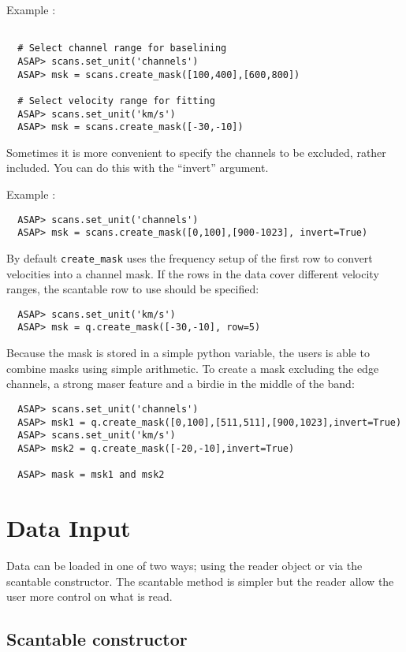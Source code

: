 \documentclass[11pt]{article}
\newcommand{\cmd}[1]{{\tt #1}}
\begin{document}
Example :
\begin{verbatim}

  # Select channel range for baselining
  ASAP> scans.set_unit('channels')
  ASAP> msk = scans.create_mask([100,400],[600,800])

  # Select velocity range for fitting
  ASAP> scans.set_unit('km/s')
  ASAP> msk = scans.create_mask([-30,-10])
\end{verbatim}

Sometimes it is more convenient to specify the channels to be
excluded, rather included.  You can do this with the ``invert''
argument.

Example :
\begin{verbatim}
  ASAP> scans.set_unit('channels')
  ASAP> msk = scans.create_mask([0,100],[900-1023], invert=True)
\end{verbatim}

By default \cmd{create\_mask} uses the frequency setup of the first row
to convert velocities into a channel mask. If the rows in the data
cover different velocity ranges, the scantable row to use should be
specified:

\begin{verbatim}
  ASAP> scans.set_unit('km/s')
  ASAP> msk = q.create_mask([-30,-10], row=5)
\end{verbatim}

Because the mask is stored in a simple python variable, the users is
able to combine masks using simple arithmetic. To create a mask
excluding the edge channels, a strong maser feature and a birdie in
the middle of the band:

\begin{verbatim}
  ASAP> scans.set_unit('channels')
  ASAP> msk1 = q.create_mask([0,100],[511,511],[900,1023],invert=True)
  ASAP> scans.set_unit('km/s')
  ASAP> msk2 = q.create_mask([-20,-10],invert=True)

  ASAP> mask = msk1 and msk2
\end{verbatim}


\section{Data Input}

Data can be loaded in one of two ways; using the reader object or via
the scantable constructor. The scantable method is simpler but the
reader allow the user more control on what is read.

\subsection{Scantable constructor}
\end{document}
